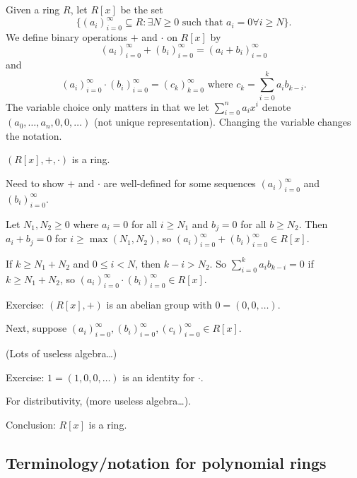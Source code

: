 \documentclass[12pt,letterpaper]{report}
\begin{document}
\begin{defn}{}{}
  Given a ring $R$, let $R[x]$ be the set
  \[
    \{ (a_i)_{i = 0}^\infty \subseteq R :
      \exists N \geq 0 \text{ such that } a_i = 0 \forall i \geq N \}.
  \]
  We define binary operations $+$ and $\cdot$ on $R[x]$ by
  \[ (a_i)_{i = 0}^\infty + (b_i)_{i = 0}^\infty = (a_i + b_i)_{i = 0}^\infty \]
  and
  \[
    (a_i)_{i = 0}^\infty \cdot (b_i)_{i = 0}^\infty = (c_k)_{k = 0}^\infty
      \text{ where } c_k = \sum_{i = 0}^k a_i b_{k - i}.
  \]
  The variable choice only matters in that we let $\sum_{i = 0}^n a_i x^i$ denote
  $(a_0, \ldots, a_n, 0, 0, \ldots)$ (not unique representation).
  Changing the variable changes the notation.
\end{defn}

\begin{lem}{}{}
  $(R[x], +, \cdot)$ is a ring.
\end{lem}

\begin{thmproof}
  Need to show $+$ and $\cdot$ are well-defined for some sequences $(a_i)_{i = 0}^\infty$ and
  $(b_i)_{i = 0}^\infty$.

  Let $N_1, N_2 \geq 0$ where $a_i = 0$ for all $i \geq N_1$ and $b_j = 0$ for all $b \geq N_2$.
  Then $a_i + b_j = 0$ for $i \geq \max(N_1, N_2)$, so
  $(a_i)_{i = 0}^\infty + (b_i)_{i = 0}^\infty \in R[x]$.

  If $k \geq N_1 + N_2$ and $0 \leq i < N$, then $k - i > N_2$.
  So $\sum_{i = 0}^k a_i b_{k - i} = 0$ if $k \geq N_1 + N_2$, so
  $(a_i)_{i = 0}^\infty \cdot (b_i)_{i = 0}^\infty \in R[x]$.

  Exercise: $(R[x], +)$ is an abelian group with $0 = (0, 0, \ldots)$.

  Next, suppose $(a_i)_{i = 0}^\infty, (b_i)_{i = 0}^\infty, (c_i)_{i = 0}^\infty \in R[x]$.

  (Lots of useless algebra\dots)

  Exercise: $1 = (1, 0, 0, \ldots)$ is an identity for $\cdot$.

  For distributivity, (more useless algebra\dots).

  Conclusion: $R[x]$ is a ring.
\end{thmproof}

\pagebreak
\subsection{Terminology/notation for polynomial rings}
\end{document}

